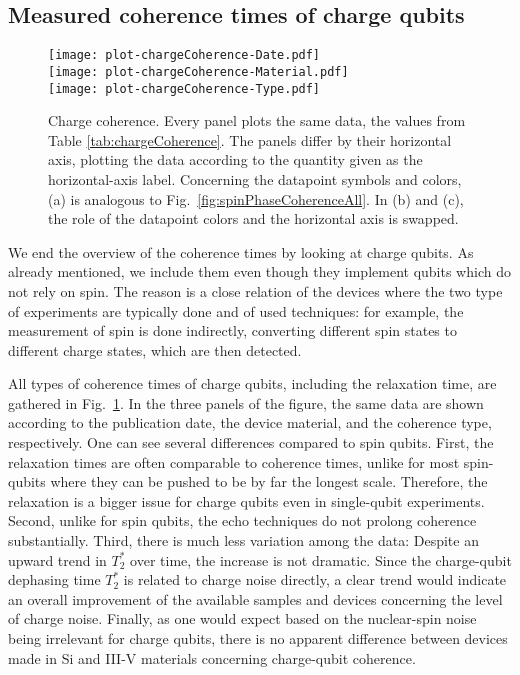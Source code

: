 \documentclass[aps, prx, showpacs, twocolumn, superscriptaddress, notitlepage, longbibliography, floatfix, nofootinbib]{revtex4-2}
\newcommand{\recheck}[1]{{#1}}
\begin{document}
\subsection{Measured coherence times of charge qubits}

\begin{figure}
  \texttt{[image: plot-chargeCoherence-Date.pdf]} \hfill \\
  \texttt{[image: plot-chargeCoherence-Material.pdf]} \hfill \\
  \texttt{[image: plot-chargeCoherence-Type.pdf]}\\
  \caption{
 \label{fig:chargeCoherence}
  Charge coherence. Every panel plots the same data, the values from Table \ref{tab:chargeCoherence}. The panels differ by their horizontal axis, plotting the data according to the quantity given as the horizontal-axis label. Concerning the datapoint symbols and colors, (a) is analogous to Fig.~\ref{fig:spinPhaseCoherenceAll}. In (b) and (c), the role of the datapoint colors and the horizontal axis is swapped. 
  }
\end{figure}

We end the overview of the coherence times by looking at charge qubits. As already mentioned, we include them even though they implement qubits which do not rely on spin. The reason is a close relation of the devices where the two type of experiments are typically done and of used techniques: for example, the measurement of spin is done indirectly, converting different spin states to different charge states, which are then detected. 

All types of coherence times of charge qubits, including the relaxation time, are gathered in Fig.~\ref{fig:chargeCoherence}. In the three panels of the figure, the same data are shown according to the publication date, the device material, and the coherence type, respectively. One can see several differences compared to spin qubits. \recheck{
First, the relaxation times are often comparable to coherence times, unlike for most spin-qubits where they can be pushed to be by far the longest scale.} 
Therefore, the relaxation is a bigger issue for charge qubits even in single-qubit experiments. \recheck{Second, unlike for spin qubits, the echo techniques do not prolong coherence substantially.} \recheck{Third, there is much less variation among the data:} 
\recheck{Despite an upward trend in $T_2^*$ over time, the increase is not dramatic. Since the charge-qubit dephasing time $T_2^*$ is related to charge noise directly, a clear trend would indicate} an overall improvement of the available samples and devices concerning the level of charge noise.
\recheck{Finally, as one would expect based on the nuclear-spin noise being irrelevant for charge qubits, there is no apparent difference between devices made in Si and III-V materials concerning charge-qubit coherence.}
\end{document}
